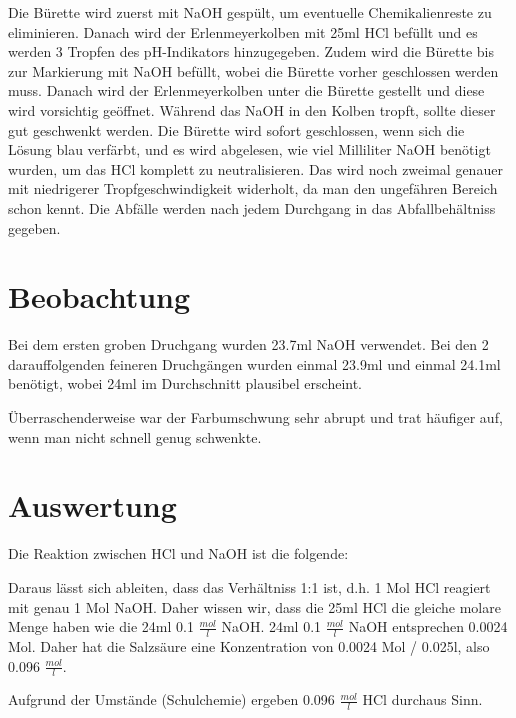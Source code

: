 \documentclass[8pt, letterpaper]{article}
\newcommand{\mpl}[1]{#1 \(\frac{mol}{l}\)}
\begin{document}
Die Bürette wird zuerst mit NaOH gespült, um eventuelle Chemikalienreste zu eliminieren.
Danach wird der Erlenmeyerkolben mit 25ml HCl befüllt und es werden 3 Tropfen des pH-Indikators hinzugegeben.
Zudem wird die Bürette bis zur Markierung mit NaOH befüllt, wobei die Bürette vorher geschlossen werden muss.
Danach wird der Erlenmeyerkolben unter die Bürette gestellt und diese wird vorsichtig geöffnet. Während das NaOH in den Kolben tropft, sollte dieser gut geschwenkt werden.
Die Bürette wird sofort geschlossen, wenn sich die Lösung blau verfärbt, und es wird abgelesen, wie viel Milliliter NaOH benötigt wurden, um das HCl komplett zu neutralisieren.
Das wird noch zweimal genauer mit niedrigerer Tropfgeschwindigkeit widerholt, da man den ungefähren Bereich schon kennt.
Die Abfälle werden nach jedem Durchgang in das Abfallbehältniss gegeben.

\section{Beobachtung}
Bei dem ersten groben Druchgang wurden 23.7ml NaOH verwendet. Bei den 2 darauffolgenden feineren Druchgängen wurden einmal 23.9ml und einmal 24.1ml benötigt, wobei 24ml im Durchschnitt plausibel erscheint.

Überraschenderweise war der Farbumschwung sehr abrupt und trat häufiger auf, wenn man nicht schnell genug schwenkte.

\section{Auswertung}
Die Reaktion zwischen HCl und NaOH ist die folgende:

\begin{center}
\end{center}

Daraus lässt sich ableiten, dass das Verhältniss 1:1 ist, d.h. 1 Mol HCl reagiert mit genau 1 Mol NaOH.
Daher wissen wir, dass die 25ml HCl die gleiche molare Menge haben wie die 24ml \mpl{0.1} NaOH.
24ml \mpl{0.1} NaOH entsprechen 0.0024 Mol.
Daher hat die Salzsäure eine Konzentration von 0.0024 Mol / 0.025l, also \mpl{0.096}.

Aufgrund der Umstände (Schulchemie) ergeben \mpl{0.096} HCl durchaus Sinn.
\end{document}
